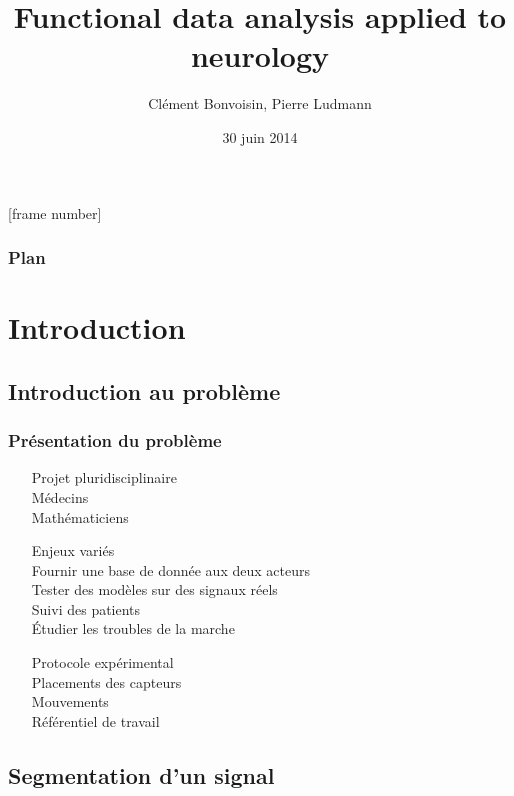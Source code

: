 \documentclass{beamer}
\begin{document}
[frame number]

\title[Signal segmentation]{Functional data analysis applied to neurology}
\author{Clément Bonvoisin, Pierre Ludmann}
\date{30 juin 2014}

\begin{frame}
\titlepage
\end{frame}

\begin{frame}
\frametitle{Plan}
  \tableofcontents[hideallsubsections]
\end{frame}



\section{Introduction}

	\subsection{Introduction au problème}

\begin{frame}
	\frametitle{Présentation du problème}
	\begin{itemize}
		\item[Projet] pluridisciplinaire
			\\ Médecins
			\\ Mathématiciens
		\item[Enjeux] variés
			\\ Fournir une base de donnée aux deux acteurs
			\\ Tester des modèles sur des signaux réels
			\\ Suivi des patients
			\\ Étudier les troubles de la marche
		\item[Protocole] expérimental
			\\ Placements des capteurs
			\\ Mouvements
			\\ Référentiel de travail
	\end{itemize}	
\end{frame}

	\subsection{Segmentation d'un signal}
\end{document}
